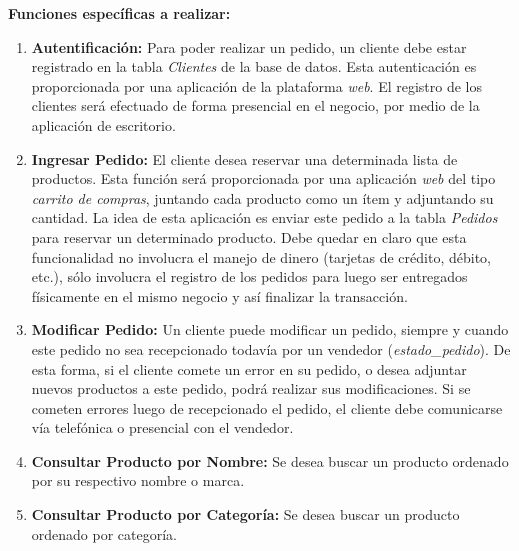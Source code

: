 \documentclass[a4paper,12pt]{article}
\begin{document}
\begin{itemize}
    \textbf{Funciones específicas a realizar:}
    \begin{enumerate}
     \item \textbf{Autentificación: }Para poder realizar un pedido, un cliente debe estar registrado en la tabla \emph{Clientes} de la base de 
			   datos. Esta autenticación es proporcionada por una aplicación de la plataforma \emph{web}. El registro de los 
			   clientes será efectuado de forma presencial en el negocio, por medio de la aplicación de escritorio.

     \item \textbf{Ingresar Pedido: }El cliente desea reservar una determinada lista de productos. Esta función será proporcionada
			            por una aplicación \emph{web} del tipo \emph{carrito de compras}, juntando cada producto como un
				    ítem y adjuntando su cantidad. La idea de esta aplicación es enviar este pedido a la tabla
                                    \emph{Pedidos} para reservar un determinado producto. Debe quedar en claro que esta funcionalidad 
				    no involucra el manejo de dinero (tarjetas de crédito, débito, etc.), sólo involucra el registro 
				    de los pedidos para luego ser entregados físicamente en el mismo negocio y así finalizar la transacción.

     \newpage

     \item \textbf{Modificar Pedido: } Un cliente puede modificar un pedido, siempre y cuando este pedido no sea recepcionado todavía por un 
				      vendedor (\emph{estado\_pedido}). De esta forma, si el cliente comete un error en su pedido, o desea adjuntar nuevos productos 
				      a este pedido, podrá realizar sus modificaciones. Si se cometen errores luego de recepcionado el pedido, 
				      el cliente debe comunicarse vía telefónica o presencial con el vendedor.

     \item \textbf{Consultar Producto por Nombre:} Se desea buscar un producto ordenado por su respectivo nombre o marca.

     \item \textbf{Consultar Producto por Categoría: } Se desea buscar un producto ordenado por categoría.


    \end{enumerate}


  \end{itemize}

\newpage
\end{document}
